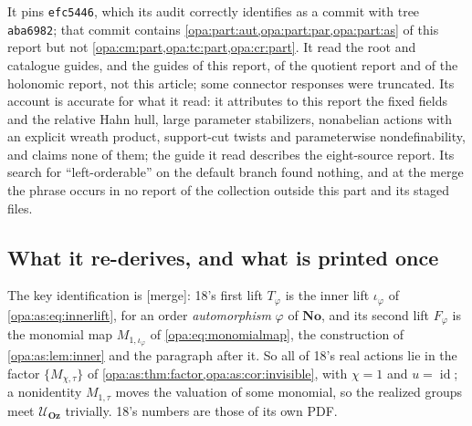 \documentclass[11pt,oneside]{article}
\numberwithin{equation}{section}
\theoremstyle{definition}
\theoremstyle{remark}
\newcommand{\No}{\mathbf{No}}
\newcommand{\Oz}{\mathbf{Oz}}
\newcommand{\UU}{\mathcal U}
\newcommand{\id}{\operatorname{id}}
\newcommand{\mergetag}{\textup{\textsf{\small[merge]}}}
\begin{document}
It pins \texttt{efc5446}, which its audit correctly identifies as a commit with tree \texttt{aba6982}; that commit contains
\cref{opa:part:aut,opa:part:par,opa:part:as} of this report but not \cref{opa:cm:part,opa:tc:part,opa:cr:part}. It read the root
and catalogue guides, and the guides of this report, of the quotient report and of the holonomic report, not this article; some
connector responses were truncated. Its account is accurate for what it read: it attributes to this report the fixed fields and
the relative Hahn hull, large parameter stabilizers, nonabelian actions with an explicit wreath product, support-cut twists and
parameterwise nondefinability, and claims none of them; the guide it read describes the eight-source report. Its search for
``left-orderable'' on the default branch found nothing, and at the merge the phrase occurs in no report of the collection outside
this part and its staged files.

\subsection{What it re-derives, and what is printed once}\label{opa:es:sub:once}

The key identification is \mergetag: 18's first lift $T_\varphi$ is the inner lift $\iota_\varphi$ of
\eqref{opa:as:eq:innerlift}, for an order \emph{automorphism} $\varphi$ of $\No$, and its second lift $F_\varphi$ is the monomial map
$M_{1,\iota_\varphi}$ of \eqref{opa:eq:monomialmap}, the construction of \cref{opa:as:lem:inner} and the paragraph after it. So all
of 18's real actions lie in the factor $\{M_{\chi,\tau}\}$ of \cref{opa:as:thm:factor,opa:as:cor:invisible}, with $\chi=1$ and
$u=\id$; a nonidentity $M_{1,\tau}$ moves the valuation of some monomial, so the realized groups meet $\UU_\Oz$ trivially.
18's numbers are those of its own PDF.
\end{document}
